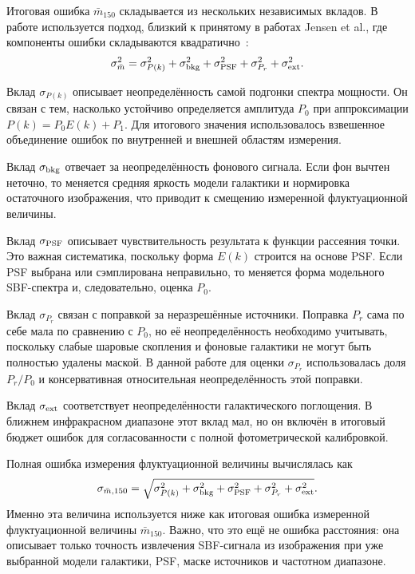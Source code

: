 \documentclass[12pt,a4paper]{article}
\begin{document}
Итоговая ошибка $\bar{m}_{150}$ складывается из нескольких независимых вкладов. В работе используется подход, близкий к принятому в работах Jensen et al., где компоненты ошибки складываются квадратично~\cite{Jensen2015,Jensen2025}:
\begin{equation}
    \sigma_{\bar{m}}^2 =
    \sigma_{P(k)}^2 +
    \sigma_{\rm bkg}^2 +
    \sigma_{\rm PSF}^2 +
    \sigma_{P_r}^2 +
    \sigma_{\rm ext}^2.
\end{equation}

Вклад $\sigma_{P(k)}$ описывает неопределённость самой подгонки спектра мощности. Он связан с тем, насколько устойчиво определяется амплитуда $P_0$ при аппроксимации $P(k)=P_0E(k)+P_1$. Для итогового значения использовалось взвешенное объединение ошибок по внутренней и внешней областям измерения.

Вклад $\sigma_{\rm bkg}$ отвечает за неопределённость фонового сигнала. Если фон вычтен неточно, то меняется средняя яркость модели галактики и нормировка остаточного изображения, что приводит к смещению измеренной флуктуационной величины.

Вклад $\sigma_{\rm PSF}$ описывает чувствительность результата к функции рассеяния точки. Это важная систематика, поскольку форма $E(k)$ строится на основе PSF. Если PSF выбрана или сэмплирована неправильно, то меняется форма модельного SBF-спектра и, следовательно, оценка $P_0$.

Вклад $\sigma_{P_r}$ связан с поправкой за неразрешённые источники. Поправка $P_r$ сама по себе мала по сравнению с $P_0$, но её неопределённость необходимо учитывать, поскольку слабые шаровые скопления и фоновые галактики не могут быть полностью удалены маской. В данной работе для оценки $\sigma_{P_r}$ использовалась доля $P_r/P_0$ и консервативная относительная неопределённость этой поправки.

Вклад $\sigma_{\rm ext}$ соответствует неопределённости галактического поглощения. В ближнем инфракрасном диапазоне этот вклад мал, но он включён в итоговый бюджет ошибок для согласованности с полной фотометрической калибровкой.

Полная ошибка измерения флуктуационной величины вычислялась как
\begin{equation}
    \sigma_{\bar{m},150} =
    \sqrt{
    \sigma_{P(k)}^2 +
    \sigma_{\rm bkg}^2 +
    \sigma_{\rm PSF}^2 +
    \sigma_{P_r}^2 +
    \sigma_{\rm ext}^2
    }.
\end{equation}
Именно эта величина используется ниже как итоговая ошибка измеренной флуктуационной величины $\bar{m}_{150}$. Важно, что это ещё не ошибка расстояния: она описывает только точность извлечения SBF-сигнала из изображения при уже выбранной модели галактики, PSF, маске источников и частотном диапазоне.
\end{document}
